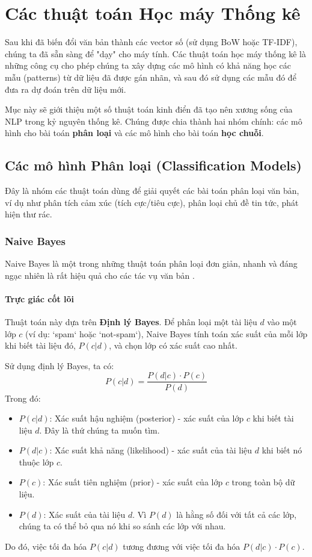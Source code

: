 
\section{Các thuật toán Học máy Thống kê}
\label{sec:statistical_ml_algos}

Sau khi đã biến đổi văn bản thành các vector số (sử dụng BoW hoặc TF-IDF), chúng ta đã sẵn sàng để "dạy" cho máy tính. Các thuật toán học máy thống kê là những công cụ cho phép chúng ta xây dựng các mô hình có khả năng học các mẫu (patterns) từ dữ liệu đã được gán nhãn, và sau đó sử dụng các mẫu đó để đưa ra dự đoán trên dữ liệu mới.

Mục này sẽ giới thiệu một số thuật toán kinh điển đã tạo nên xương sống của NLP trong kỷ nguyên thống kê. Chúng được chia thành hai nhóm chính: các mô hình cho bài toán \textbf{phân loại} và các mô hình cho bài toán \textbf{học chuỗi}.

\subsection{Các mô hình Phân loại (Classification Models)}
\label{ssec:classification_models}
Đây là nhóm các thuật toán dùng để giải quyết các bài toán phân loại văn bản, ví dụ như phân tích cảm xúc (tích cực/tiêu cực), phân loại chủ đề tin tức, phát hiện thư rác.

\subsubsection{Naive Bayes}
Naive Bayes là một trong những thuật toán phân loại đơn giản, nhanh và đáng ngạc nhiên là rất hiệu quả cho các tác vụ văn bản \cite{manning2008introduction}.

\paragraph{Trực giác cốt lõi}
Thuật toán này dựa trên \textbf{Định lý Bayes}. Để phân loại một tài liệu $d$ vào một lớp $c$ (ví dụ: `spam` hoặc `not-spam`), Naive Bayes tính toán xác suất của mỗi lớp khi biết tài liệu đó, $P(c|d)$, và chọn lớp có xác suất cao nhất.

Sử dụng định lý Bayes, ta có:
$$ P(c|d) = \frac{P(d|c) \cdot P(c)}{P(d)} $$
Trong đó:
\begin{itemize}
    \item $P(c|d)$: Xác suất hậu nghiệm (posterior) - xác suất của lớp $c$ khi biết tài liệu $d$. Đây là thứ chúng ta muốn tìm.
    \item $P(d|c)$: Xác suất khả năng (likelihood) - xác suất của tài liệu $d$ khi biết nó thuộc lớp $c$.
    \item $P(c)$: Xác suất tiên nghiệm (prior) - xác suất của lớp $c$ trong toàn bộ dữ liệu.
    \item $P(d)$: Xác suất của tài liệu $d$. Vì $P(d)$ là hằng số đối với tất cả các lớp, chúng ta có thể bỏ qua nó khi so sánh các lớp với nhau.
\end{itemize}
Do đó, việc tối đa hóa $P(c|d)$ tương đương với việc tối đa hóa $P(d|c) \cdot P(c)$.

